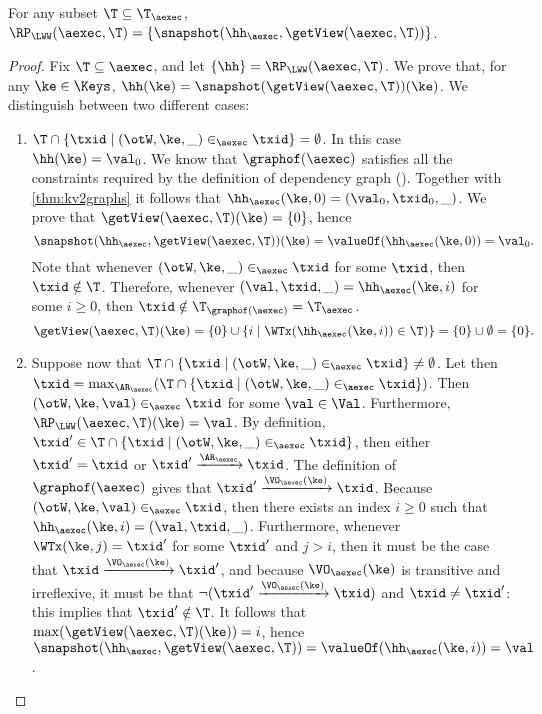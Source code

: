 \begin{proposition}
\label{prop:compatible.aexec2kv}
For any subset $\T \subseteq \T_{\aexec}$, $\RP_{\LWW}(\aexec, \T) = \{\snapshot(\hh_{\aexec}, \getView(\aexec, \T))\}$.
\end{proposition}

\begin{proof}
Fix $\T \subseteq \aexec$, and let $\{\hh\} = \RP_{\LWW}(\aexec, \T)$. We prove that, for any $\ke \in \Keys$, 
$\hh(\ke) = \snapshot(\getView(\aexec, \T))(\ke)$. We distinguish between two different cases: 
\begin{enumerate}
\item $\T \cap \{ \txid \mid (\otW, \ke, \_) \in_{\aexec} \txid \} = \emptyset$. 
In this case $\hh(\ke) = \val_0$. 
We know that $\graphof(\aexec)$ satisfies all the constraints required by the definition of dependency graph 
(\cite{laws}). Together with \ref{thm:kv2graphs} it follows that $\hh_{\aexec}(\ke, 0) = (\val_0, \txid_0, \_)$.
We prove that $\getView(\aexec, \T)(\ke) = \{0\}$, 
hence 
\[ 
\snapshot(\hh_{\aexec}, \getView(\aexec, \T))(\ke) = \valueOf(\hh_{\aexec}(\ke, 0)) = \val_{0}.
\]
Note that whenever $(\otW, \ke, \_) \in_{\aexec} \txid$ for some $\txid$, then 
$\txid \notin \T$. Therefore, whenever $(\val, \txid, \_) = \hh_{\aexec}(\ke, i)$ for some $i \geq 0$, then 
$\txid \notin \T_{\graphof(\aexec)} = \T_{\aexec}$.
\[
\getView(\aexec, \T)(\ke) = \{0\} \cup \{i \mid \WTx(\hh_{\aexec}(\ke, i)) \in \T)\} = \{0\} \cup \emptyset = \{0\}.
\]
\item Suppose now that $\T \cap \{ \txid \mid (\otW, \ke, \_) \in_{\aexec} \txid \} \neq \emptyset$. 
Let then $\txid = \max_{\AR_{\aexec}}(\T \cap \{\txid \mid (\otW, \ke, \_) \in_{\aexec} \txid\})$. 
Then $(\otW, \ke, \val) \in_{\aexec} \txid$ for some $\val \in \Val$. Furthermore, $\RP_{\LWW}(\aexec, \T)(\ke) = \val$.
By definition, $\txid' \in \T \cap \{ \txid \mid (\otW, \ke, \_) \in_{\aexec} \txid\}$, 
then either $\txid' = \txid$ or $\txid' \xrightarrow{\AR_{\aexec}} \txid$. The definition of 
$\graphof(\aexec)$ gives that $\txid' \xrightarrow{\VO_{\aexec}(\ke)} \txid$. 
Because $(\otW, \ke, \val) \in_{\aexec} \txid$, then there exists an index 
$i \geq 0$ such that $\hh_{\aexec}(\ke, i) = (\val, \txid, \_)$. Furthermore, 
whenever $\WTx(\ke, j) = \txid'$ for some $\txid'$ and $j > i$, then it must 
be the case that $\txid \xrightarrow{\VO_{\aexec}(\ke)} \txid'$, and because 
$\VO_{\aexec}(\ke)$ is transitive and irreflexive, it must be that  
$\neg( \txid' \xrightarrow{\VO_{\aexec}(\ke)} \txid)$ and $\txid \neq \txid'$: this implies that 
$\txid' \notin \T$. It follows that $\max(\getView(\aexec, \T)(\ke)) = i$, hence 
$\snapshot(\hh_{\aexec}, \getView(\aexec, \T)) = \valueOf(\hh_{\aexec}(\ke, i)) = \val$.
\end{enumerate}
\end{proof}

